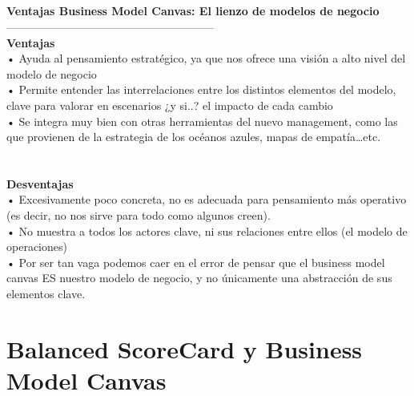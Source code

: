 \documentclass[twoside,twocolumn]{article}
\begin{document}
\begin{flushright}
\begin{itemize}
\textbf{}\\
\textbf{}\\
\textbf{}\\
\textbf{}\\
\textbf{}\\
\textbf{}\\
\textbf{}\\
\textbf{}\\
\textbf{}\\
\textbf{Ventajas Business Model Canvas: El lienzo de modelos de negocio}\\
--------------------------------------------------------
\textbf{}\\
\textbf{Ventajas}\\
•	Ayuda al pensamiento estratégico, ya que nos ofrece una visión a alto nivel del modelo de negocio\\
•	Permite entender las interrelaciones entre los distintos elementos del modelo, clave para valorar en escenarios ¿y si..? el impacto de cada cambio\\
•	Se integra muy bien con otras herramientas del nuevo management, como las que provienen de la estrategia de los océanos azules, mapas de empatía…etc.\\
\textbf{}\\
\textbf{}\\
\textbf{Desventajas}\\
•	Excesivamente poco concreta, no es adecuada para pensamiento más operativo (es decir, no nos sirve para todo como algunos creen).\\
•	No muestra a todos los actores clave, ni sus relaciones entre ellos (el modelo de operaciones)\\
•	Por ser tan vaga podemos caer en el error de pensar que el business model canvas ES nuestro modelo de negocio, y no únicamente una abstracción de sus elementos clave.\\




\section{Balanced ScoreCard y Business Model Canvas}


\end{itemize}
\end{flushright}
\end{document}
